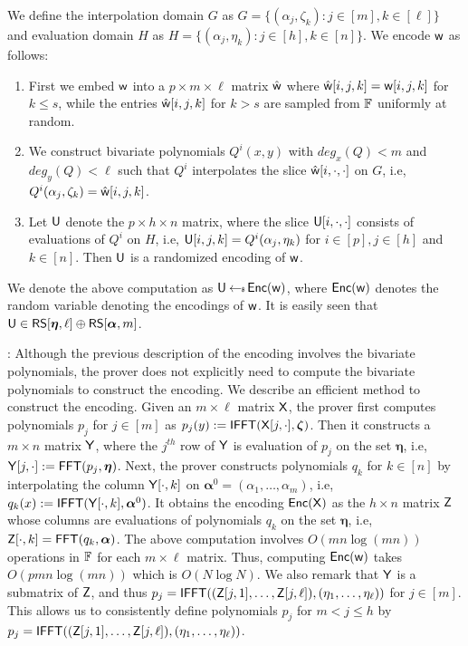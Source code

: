 We define the interpolation domain $G$ as $G=\{(\alpha_j,\zeta_k): j\in[m],
k\in [\ell]\}$ and evaluation domain $H$ as $H=\{(\alpha_j,\eta_k): j\in [h],
k\in [n]\}$. We encode $\mathsf{w}$ as follows:
\begin{enumerate}[{\rm (i)}]
\item First we embed $\mathsf{w}$ into a $p\times m\times \ell$ matrix $\hat{\mathsf{w}}$
where $\hat{\mathsf{w}}[i,j,k]=\mathsf{w}[i,j,k]$ for $k\leq s$, while the entries
$\hat{\mathsf{w}}[i,j,k]$ for $k>s$ are sampled from $\mathbb{F}$ uniformly at random.
\item We construct bivariate polynomials $Q^i(x,y)$ with $deg_x(Q)<m$ and
$deg_y(Q)<\ell$ such that $Q^i$ interpolates the slice
$\hat{\mathsf{w}}[i,\cdot,\cdot]$ on $G$, i.e,
$Q^i(\alpha_j,\zeta_k)=\hat{\mathsf{w}}[i,j,k]$. 
\item Let $\mathsf{U}$ denote the $p\times h\times n$ matrix, where the slice
$\mathsf{U}[i,\cdot,\cdot]$ consists of evaluations of $Q^i$ on $H$, i.e,
$\mathsf{U}[i,j,k]=Q^i(\alpha_j,\eta_k)$ for $i\in [p], j\in [h]$ and $k\in [n]$.
Then $\mathsf{U}$ is a randomized encoding of $\mathsf{w}$.
\end{enumerate}
We denote the above computation as $\mathsf{U}\hskip2.3pt{\gets\!\!\mbox{\tiny${\$}$\normalsize}}\, \mathsf{Enc}(\mathsf{w})$, where $\mathsf{Enc}(\mathsf{w})$
denotes the random variable denoting the encodings of $\mathsf{w}$. It is easily seen
that $\mathsf{U}\in \mathsf{RS}[\bm{\eta},\ell]\oplus \mathsf{RS}[\bm{\alpha},m]$.\smallskip

: Although the previous
description of the encoding involves the bivariate polynomials, 
the prover does not explicitly need to compute the bivariate polynomials to
construct the encoding. We describe an efficient method to construct the
encoding. Given an $m\times \ell$
matrix $\mathsf{X}$, the prover first computes polynomials $p_j$ for $j\in
[m]$ as $p_j(y) := \mathsf{IFFT}(\mathsf{X}[j,\cdot], \bm{\zeta})$. Then it constructs a $m\times n$
matrix $\mathsf{Y}$, where the $j^{th}$ row of $\mathsf{Y}$ is evaluation of $p_j$ on the set
$\bm{\eta}$, i.e, $\mathsf{Y}[j,\cdot] := \mathsf{FFT}(p_j, \bm{\eta})$. Next, the prover constructs
polynomials $q_k$ for $k\in [n]$ by interpolating the column $\mathsf{Y}[\cdot,k]$ on
$\bm{\alpha}^0 = (\alpha_1,\ldots,\alpha_m)$, i.e, $q_k(x) := \mathsf{IFFT}(\mathsf{Y}[\cdot,k],
\bm{\alpha}^0)$. It obtains the encoding $\mathsf{Enc}(\mathsf{X})$ as the $h\times n$ matrix
$\mathsf{Z}$ whose columns are evaluations of polynomials $q_k$ on the set $\bm{\eta}$, i.e,
$\mathsf{Z}[\cdot,k]=\mathsf{FFT}(q_k,\bm{\alpha})$. The above computation involves
$O(mn\log(mn))$ operations in $\mathbb{F}$ for each $m\times \ell$ matrix. Thus, computing $\mathsf{Enc}(\mathsf{w})$ takes
$O(pmn\log(mn))$ which is $O(N\log{N})$. We also remark that $\mathsf{Y}$ is a submatrix
of $\mathsf{Z}$, and thus
$p_j=\mathsf{IFFT}((\mathsf{Z}[j,1],\ldots,\mathsf{Z}[j,\ell]),(\eta_1,\ldots,\eta_{\ell}))$ for $j\in
[m]$. This allows us to consistently define polynomials $p_j$ for $m<j\leq h$ by
$p_j=\mathsf{IFFT}((\mathsf{Z}[j,1],\ldots,\mathsf{Z}[j,\ell]),(\eta_1,\ldots,\eta_{\ell}))$.

